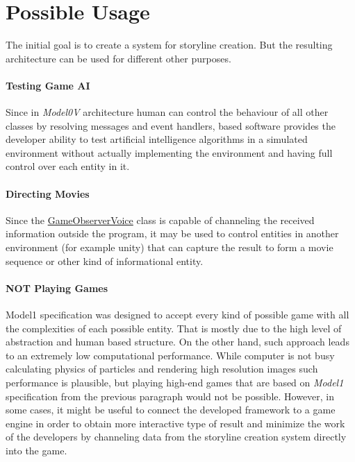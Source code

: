 \section{Possible Usage}
The initial goal is to create a system for storyline creation. But the resulting architecture can be used for different other purposes.
\paragraph{Testing Game AI}
Since in \textit{Model0V} architecture human can control the behaviour of all other classes by resolving messages and event handlers,  based software provides the developer ability to test artificial intelligence algorithms in a simulated environment without actually implementing the environment and having full control over each entity in it.
\paragraph{Directing Movies}
Since the \underline{GameObserverVoice} class is capable of channeling the received information outside the program, it may be used to control entities in another environment (for example unity) that can capture the result to form a movie sequence or other kind of informational entity.
\paragraph{NOT Playing Games}
Model1 specification was designed to accept every kind of possible game with all the complexities of each possible entity. That is mostly due to the high level of abstraction and human based structure. On the other hand, such approach leads to an extremely low computational performance. While computer is not busy calculating physics of particles and rendering high resolution images such performance is plausible, but playing high-end games that are based on \textit{Model1} specification from the previous paragraph would not be possible. However, in some cases, it might be useful to connect the developed framework to a game engine in order to obtain more interactive type of result and minimize the work of the developers by channeling data from the storyline creation system directly into the game.

